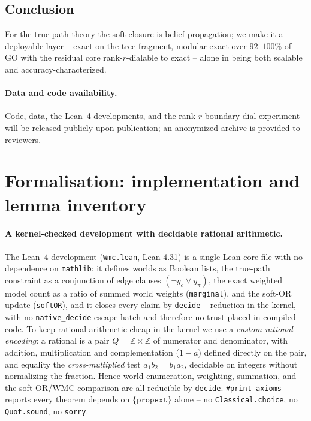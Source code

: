 \documentclass[anon]{nesy2026}
\begin{document}
\subsection{Conclusion}
For the true-path theory the soft closure is belief propagation; we make it a deployable layer -- exact on the tree fragment, modular-exact over $92$--$100\%$ of GO with the residual core rank-$r$-dialable to exact -- alone in being both scalable and accuracy-characterized.

\paragraph{Data and code availability.}
Code, data, the Lean~4 developments, and the rank-$r$ boundary-dial experiment will be released
publicly upon publication; an anonymized archive is provided to reviewers.




\appendix

\section{Formalisation: implementation and lemma inventory}\label{app:lean}

\paragraph{A kernel-checked development with decidable rational arithmetic.}
The Lean~4 development (\texttt{Wmc.lean}, Lean 4.31) is a single Lean-core file with no
dependence on \texttt{mathlib}: it defines worlds as Boolean lists, the true-path constraint
as a conjunction of edge clauses $(\neg y_c \vee y_\pi)$, the exact weighted model count as a
ratio of summed world weights (\texttt{marginal}), and the soft-OR update (\texttt{softOR}),
and it closes every claim by \texttt{decide} -- reduction in the kernel, with no
\texttt{native\_decide} escape hatch and therefore no trust placed in compiled code. To keep
rational arithmetic cheap in the kernel we use a \emph{custom rational encoding}: a rational
is a pair $Q=\mathbb{Z}\times\mathbb{Z}$ of numerator and denominator, with addition,
multiplication and complementation ($1-a$) defined directly on the pair, and equality the
\emph{cross-multiplied} test $a_1 b_2 = b_1 a_2$, decidable on integers without normalizing the
fraction. Hence world enumeration, weighting, summation, and the soft-OR/WMC comparison are all
reducible by \texttt{decide}. \texttt{\#print axioms} reports every theorem depends on
$\{\texttt{propext}\}$ alone -- no \texttt{Classical.choice}, no \texttt{Quot.sound}, no
\texttt{sorry}.
\end{document}
